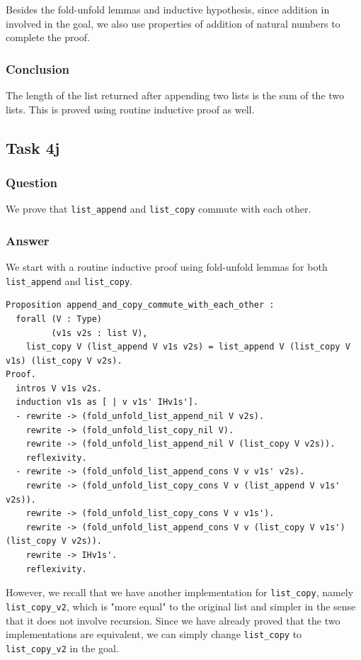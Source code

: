 \documentclass{article}
\begin{document}
Besides the fold-unfold lemmas and inductive hypothesis, since addition in involved in the goal, we also use properties of addition of natural numbers to complete the proof.

\subsubsection{Conclusion}
The length of the list returned after appending two lists is the sum of the two lists. This is proved using routine inductive proof as well.

\subsection{Task 4j}

\subsubsection{Question}
We prove that \texttt{list\_append} and \texttt{list\_copy} commute with each other.

\subsubsection{Answer}
We start with a routine inductive proof using fold-unfold lemmas for both \texttt{list\_append} and \texttt{list\_copy}.

\begin{lstlisting}
Proposition append_and_copy_commute_with_each_other :
  forall (V : Type)
         (v1s v2s : list V),
    list_copy V (list_append V v1s v2s) = list_append V (list_copy V v1s) (list_copy V v2s).
Proof.
  intros V v1s v2s.
  induction v1s as [ | v v1s' IHv1s'].
  - rewrite -> (fold_unfold_list_append_nil V v2s).
    rewrite -> (fold_unfold_list_copy_nil V).
    rewrite -> (fold_unfold_list_append_nil V (list_copy V v2s)).
    reflexivity.
  - rewrite -> (fold_unfold_list_append_cons V v v1s' v2s).
    rewrite -> (fold_unfold_list_copy_cons V v (list_append V v1s' v2s)).
    rewrite -> (fold_unfold_list_copy_cons V v v1s').
    rewrite -> (fold_unfold_list_append_cons V v (list_copy V v1s') (list_copy V v2s)).
    rewrite -> IHv1s'.
    reflexivity.
\end{lstlisting}

However, we recall that we have another implementation for \texttt{list\_copy}, namely \texttt{list\_copy\_v2}, which is "more equal" to the original list and simpler in the sense that it does not involve recursion. Since we have already proved that the two implementations are equivalent, we can simply change \texttt{list\_copy} to \texttt{list\_copy\_v2} in the goal.
\end{document}
